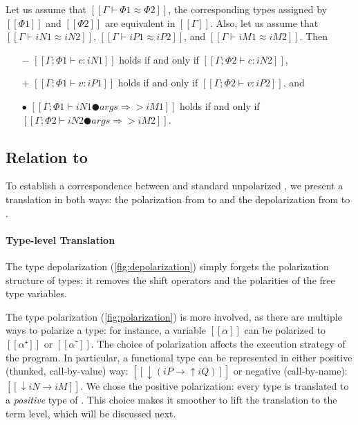 \begin{property}
  Let us assume that $[[Γ ⊢ Φ1 ≈ Φ2]]$, \ie  
  the corresponding types assigned by $[[Φ1]]$ and
  $[[Φ2]]$ are equivalent in $[[Γ]]$.
  Also, let us assume that 
  $[[Γ ⊢ iN1 ≈ iN2]]$, $[[Γ ⊢ iP1 ≈ iP2]]$,
  and $[[Γ ⊢ iM1 ≈ iM2]]$. Then
  \begin{itemize}
    \item [$-$] $[[Γ ; Φ1 ⊢ c : iN1]]$ holds if and only if $[[Γ ; Φ2 ⊢ c : iN2]]$,
    \item [$+$] $[[Γ ; Φ1 ⊢ v : iP1]]$ holds if and only if $[[Γ ; Φ2 ⊢ v : iP2]]$, and
    \item [$\bullet$] $[[Γ; Φ1 ⊢ iN1 ● args ⇒> iM1]]$ holds if and only if $[[Γ; Φ2 ⊢ iN2 ● args ⇒> iM2]]$.
  \end{itemize}
\end{property}

\subsection{Relation to \systemf}
\label{sec:rel-to-systemf}

To establish a correspondence between \fexists and standard unpolarized \systemf,
we present a translation in both ways: the polarization from \systemf to \fexists
and the depolarization from \fexists to \systemf.



\paragraph*{Type-level Translation}

The type depolarization (\cref{fig:depolarization}) simply forgets the polarization structure of types:
it removes the shift operators and the polarities of the free type variables.

The type polarization (\cref{fig:polarization}) is more involved, as there are
multiple ways to polarize a type: for instance, a variable $[[α]]$ can be
polarized to $[[α⁺]]$ or $[[α⁻]]$. The choice of polarization affects the
execution strategy of the program. 
In particular, a functional type can be represented in either positive (thunked, call-by-value) way:
$[[↓(iP → ↑iQ)]]$ or negative (call-by-name): $[[↓iN → iM]]$.
We chose the positive polarization: every \systemf type is translated to a
\emph{positive} type of \fexists. This choice makes it smoother to lift the
translation to the term level, which will be discussed next.

